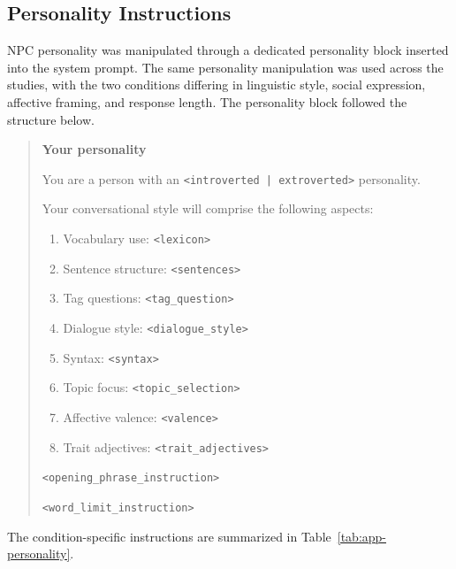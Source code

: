 \documentclass[a4paper,fleqn]{cas-sc}
\begin{document}
\subsection{Personality Instructions}
\label{app:personality}

NPC personality was manipulated through a dedicated personality block inserted into the system prompt.
The same personality manipulation was used across the studies, with the two conditions differing in linguistic style, social expression, affective framing, and response length.
The personality block followed the structure below.

\begin{quote}
\small

\textbf{Your personality}

You are a person with an \texttt{<introverted | extroverted>} personality.

Your conversational style will comprise the following aspects:

\begin{enumerate}
    \item Vocabulary use: \texttt{<lexicon>}
    \item Sentence structure: \texttt{<sentences>}
    \item Tag questions: \texttt{<tag\_question>}
    \item Dialogue style: \texttt{<dialogue\_style>}
    \item Syntax: \texttt{<syntax>}
    \item Topic focus: \texttt{<topic\_selection>}
    \item Affective valence: \texttt{<valence>}
    \item Trait adjectives: \texttt{<trait\_adjectives>}
\end{enumerate}

\texttt{<opening\_phrase\_instruction>}

\texttt{<word\_limit\_instruction>}

\end{quote}

The condition-specific instructions are summarized in Table~\ref{tab:app-personality}.
\end{document}
